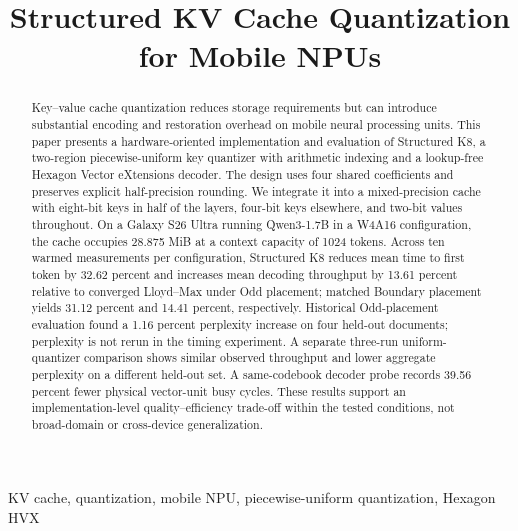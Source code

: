 \documentclass[conference,a4paper,10pt]{IEEEtran}
\begin{document}
\title{Structured KV Cache Quantization for Mobile NPUs}
\author{
}
\maketitle

\begin{abstract}
Key--value cache quantization reduces storage requirements but can introduce substantial encoding and restoration overhead on mobile neural processing units. This paper presents a hardware-oriented implementation and evaluation of Structured K8, a two-region piecewise-uniform key quantizer with arithmetic indexing and a lookup-free Hexagon Vector eXtensions decoder. The design uses four shared coefficients and preserves explicit half-precision rounding. We integrate it into a mixed-precision cache with eight-bit keys in half of the layers, four-bit keys elsewhere, and two-bit values throughout. On a Galaxy S26 Ultra running Qwen3-1.7B in a W4A16 configuration, the cache occupies 28.875 MiB at a context capacity of 1024 tokens. Across ten warmed measurements per configuration, Structured K8 reduces mean time to first token by 32.62 percent and increases mean decoding throughput by 13.61 percent relative to converged Lloyd--Max under Odd placement; matched Boundary placement yields 31.12 percent and 14.41 percent, respectively. Historical Odd-placement evaluation found a 1.16 percent perplexity increase on four held-out documents; perplexity is not rerun in the timing experiment. A separate three-run uniform-quantizer comparison shows similar observed throughput and lower aggregate perplexity on a different held-out set. A same-codebook decoder probe records 39.56 percent fewer physical vector-unit busy cycles. These results support an implementation-level quality--efficiency trade-off within the tested conditions, not broad-domain or cross-device generalization.
\end{abstract}

\begin{IEEEkeywords}
KV cache, quantization, mobile NPU, piecewise-uniform quantization, Hexagon HVX
\end{IEEEkeywords}
\end{document}

